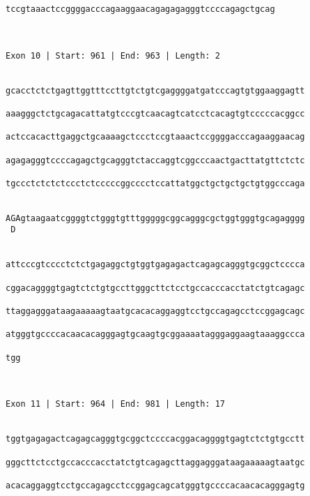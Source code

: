 \documentclass{article}
\begin{document}
\begin{Verbatim}
tccgtaaactccggggacccagaaggaacagagagagggtccccagagctgcag
                                                      
                                                      
 
Exon 10 | Start: 961 | End: 963 | Length: 2


gcacctctctgagttggtttccttgtctgtcgaggggatgatcccagtgtggaaggagtt
                                                            
aaagggctctgcagacattatgtcccgtcaacagtcatcctcacagtgtcccccacggcc
                                                            
actccacacttgaggctgcaaaagctccctccgtaaactccggggacccagaaggaacag
                                                            
agagagggtccccagagctgcagggtctaccaggtcggcccaactgacttatgttctctc
                                                            
tgccctctctctccctctcccccggcccctccattatggctgctgctgctgtggcccaga
                                                            
                                                            
AGAgtaagaatcggggtctgggtgtttgggggcggcagggcgctggtgggtgcagagggg
 D                                                          
                                                            
  
attcccgtcccctctctgagaggctgtggtgagagactcagagcagggtgcggctcccca
                                                            
cggacaggggtgagtctctgtgccttgggcttctcctgccacccacctatctgtcagagc
                                                            
ttaggagggataagaaaaagtaatgcacacaggaggtcctgccagagcctccggagcagc
                                                            
atgggtgccccacaacacagggagtgcaagtgcggaaaatagggaggaagtaaaggccca
                                                            
tgg
   
   
 
Exon 11 | Start: 964 | End: 981 | Length: 17


tggtgagagactcagagcagggtgcggctccccacggacaggggtgagtctctgtgcctt
                                                            
gggcttctcctgccacccacctatctgtcagagcttaggagggataagaaaaagtaatgc
                                                            
acacaggaggtcctgccagagcctccggagcagcatgggtgccccacaacacagggagtg
                                                            

\end{Verbatim}
\end{document}
